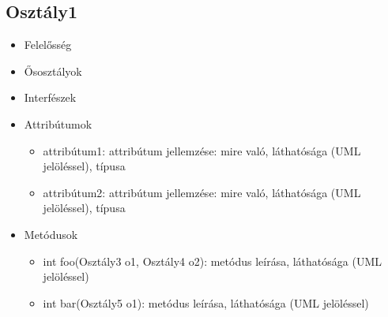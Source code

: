 \subsection{Osztály1}
\begin{itemize}
\item Felelősség\newline
{}
\item Ősosztályok\newline
{}
\item Interfészek\newline
{}
\item Attribútumok\newline
{}
	\begin{itemize}
		\item attribútum1: attribútum jellemzése: mire való, láthatósága (UML jelöléssel), típusa
		\item attribútum2: attribútum jellemzése: mire való, láthatósága (UML jelöléssel), típusa
	\end{itemize}
\item Metódusok\newline
{}
	\begin{itemize}
		\item int foo(Osztály3 o1, Osztály4 o2): metódus leírása, láthatósága (UML jelöléssel)
		\item int bar(Osztály5 o1): metódus leírása, láthatósága (UML jelöléssel)
	\end{itemize}
\end{itemize}

